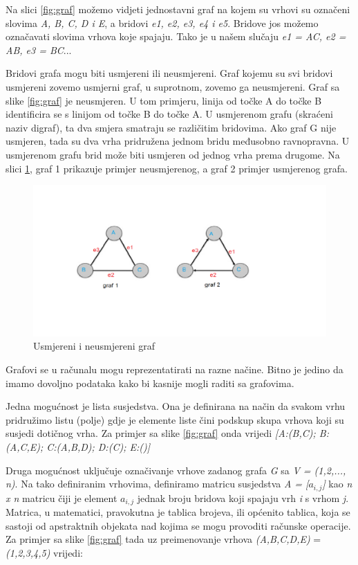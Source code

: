 \documentclass[times, utf8, zavrsni, numeric]{fer}
\begin{document}
Na slici \ref{fig:graf} možemo vidjeti jednostavni graf na kojem su vrhovi su označeni slovima  \textit{A, B, C, D i E}, a bridovi \textit{e1, e2, e3, e4 i e5}.
Bridove jos možemo označavati slovima vrhova koje spajaju.
Tako je u našem slučaju \textit{e1 = AC, e2 = AB, e3 = BC}...


Bridovi grafa mogu biti usmjereni ili neusmjereni. Graf kojemu su svi bridovi usmjereni zovemo usmjerni graf, u suprotnom, zovemo ga neusmjereni. Graf sa slike  \ref{fig:graf} je neusmjeren. U tom primjeru, linija od točke A do točke B identificira se s linijom od točke B do točke A. U usmjerenom grafu (skraćeni naziv digraf), ta dva smjera smatraju se različitim bridovima. Ako graf G nije usmjeren, tada su dva vrha pridružena jednom bridu međusobno ravnopravna. U usmjerenom grafu brid može biti usmjeren od jednog vrha prema drugome. Na slici \ref{fig:usmjereni-neusmjereni}, graf 1 prikazuje primjer neusmjerenog, a graf 2 primjer usmjerenog grafa. 

\begin{figure}[h]
	\centering
	\includegraphics[width=\linewidth]{slike/usmjereni-neusmjereni.png}
	\caption{Usmjereni i neusmjereni graf}
	\label{fig:usmjereni-neusmjereni}
\end{figure}


Grafovi se u računalu mogu reprezentatirati na razne načine. Bitno je jedino da imamo dovoljno podataka kako bi kasnije mogli raditi sa grafovima.

Jedna mogućnost je lista susjedstva. Ona je definirana na način da svakom vrhu pridružimo listu (polje) gdje je elemente liste čini podskup skupa vrhova koji su susjedi dotičnog vrha. Za primjer sa slike \ref{fig:graf} onda vrijedi \textit{[A:(B,C); B:(A,C,E); C:(A,B,D); D:(C); E:()]}
			
Druga mogućnost uključuje označivanje vrhove zadanog grafa \textit{G} sa \textit{V = (1,2,..., n)}. Na tako definiranim vrhovima, definiramo matricu susjedstva \textit{A = [$a_{i,j}$]} kao \textit{n x n} matricu čiji je element $a_{i,j}$ jednak broju bridova koji spajaju vrh \textit{i} s vrhom \textit{j}. Matrica, u matematici, pravokutna je tablica brojeva, ili općenito tablica, koja se sastoji od apstraktnih objekata nad kojima se mogu provoditi računske operacije.
Za primjer sa slike \ref{fig:graf} tada uz preimenovanje vrhova \textit{(A,B,C,D,E)} = \textit{(1,2,3,4,5)} vrijedi:
\end{document}
